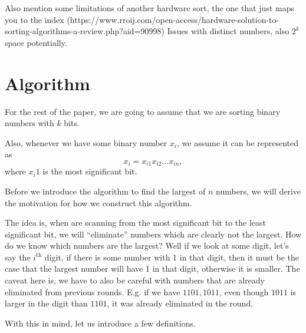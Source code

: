 \documentclass{article}
\begin{document}
Also mention some limitations of another hardware sort, the one that just maps you to the index (https://www.rroij.com/open-access/hardware-solution-to-sorting-algorithms-a-review.php?aid=90998)
Issues with distinct numbers, also $2^k$ space potentially.

\section{Algorithm}

For the rest of the paper, we are going to assume that we are sorting binary numbers with $k$ bits.

Also, whenever we have some binary number $x_i$, we assume it can be represented as 
\begin{equation}
  x_i = x_{i1}x_{i2}\dots x_{in},
\end{equation}
where $x_i1$ is the most significant bit.

Before we introduce the algorithm to find the largest of $n$ numbers, we will derive the motivation for how we construct this algorithm.

The idea is, when are scanning from the most significant bit to the least significant bit, we will ``eliminate'' numbers which are clearly not the largest.
How do we know which numbers are the largest? Well if we look at some digit, let's say the $i^\text{th}$ digit, if there is some number with 1 in that digit, then it must be the case that the largest number will have 1 in that digit, otherwise it is smaller.
The caveat here is, we have to also be careful with numbers that are already eliminated from previous rounds. E.g. if we have $1101, 1011$, even though $1011$ is larger in the  digit than $1101$, it was already eliminated in the  round.

With this in mind, let us introduce a few definitions.
\end{document}
